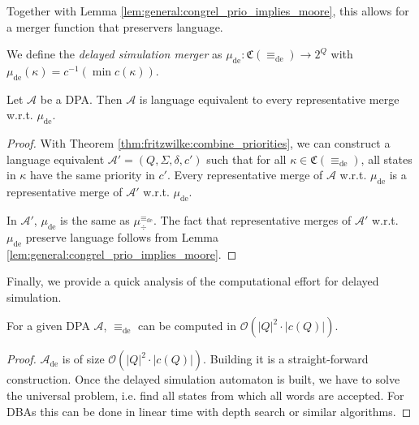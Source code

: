 \vspace{5pt}

Together with Lemma \ref{lem:general:congrel_prio_implies_moore}, this allows for a merger function that preservers language.

\begin{defn}
	We define the \emph{delayed simulation merger} as $\mu_\text{de} : \mathfrak{C}(\equiv_\text{de}) \rightarrow 2^Q$ with $\mu_\text{de}(\kappa) = c^{-1}(\min c(\kappa))$.
\end{defn}

\begin{cor}
	Let $\mathcal{A}$ be a DPA. Then $\mathcal{A}$ is language equivalent to every representative merge w.r.t. $\mu_\text{de}$.
\end{cor}

\begin{proof}
	With Theorem \ref{thm:fritzwilke:combine_priorities}, we can construct a language equivalent $\mathcal{A}' = (Q, \Sigma, \delta, c')$ such that for all $\kappa \in \mathfrak{C}(\equiv_\text{de})$, all states in $\kappa$ have the same priority in $c'$. Every representative merge of $\mathcal{A}$ w.r.t. $\mu_\text{de}$ is a representative merge of $\mathcal{A}'$ w.r.t. $\mu_\text{de}$.
	
	In $\mathcal{A}'$, $\mu_\text{de}$ is the same as $\mu^{\equiv_\text{de}}_\div$. The fact that representative merges of $\mathcal{A}'$ w.r.t. $\mu_\text{de}$ preserve language follows from Lemma \ref{lem:general:congrel_prio_implies_moore}.
\end{proof}

\vspace{10pt}

Finally, we provide a quick analysis of the computational effort for delayed simulation.

\begin{theorem}
	For a given DPA $\mathcal{A}$, $\equiv_\text{de}$ can be computed in $\mathcal{O}(|Q|^2 \cdot |c(Q)|)$.
\end{theorem}

\begin{proof}
	$\mathcal{A}_\text{de}$ is of size $\mathcal{O}(|Q|^2 \cdot |c(Q)|)$. Building it is a straight-forward construction. Once the delayed simulation automaton is built, we have to solve the universal problem, i.e. find all states from which all words are accepted. For DBAs this can be done in linear time with depth search or similar algorithms.
\end{proof}






